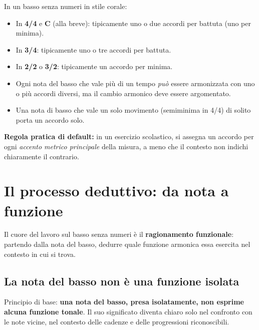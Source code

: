 \begin{regola}
	\label{reg:ritmo_armonico_battuta}
	In un basso senza numeri in stile corale:
	\begin{itemize}
		\item In \textbf{4/4} e \textbf{C} (alla breve): tipicamente uno o due accordi per battuta (uno per minima).
		\item In \textbf{3/4}: tipicamente uno o tre accordi per battuta.
		\item In \textbf{2/2} o \textbf{3/2}: tipicamente un accordo per minima.
		\item Ogni nota del basso che vale più di un tempo \textit{può} essere armonizzata con uno o più accordi diversi, ma il cambio armonico deve essere argomentato.
		\item Una nota di basso che vale un solo movimento (semiminima in 4/4) di solito porta un accordo solo.
	\end{itemize}
	\textbf{Regola pratica di default:} in un esercizio scolastico, si assegna un accordo per ogni \textit{accento metrico principale} della misura, a meno che il contesto non indichi chiaramente il contrario.
\end{regola}

\section{Il processo deduttivo: da nota a funzione}
\label{sec:processo_deduttivo}

Il cuore del lavoro sul basso senza numeri è il \textbf{ragionamento funzionale}: partendo dalla nota del basso, dedurre quale funzione armonica essa esercita nel contesto in cui si trova.

\subsection{La nota del basso non è una funzione isolata}

Principio di base: \textbf{una nota del basso, presa isolatamente, non esprime alcuna funzione tonale}. Il suo significato diventa chiaro solo nel confronto con le note vicine, nel contesto delle cadenze e delle progressioni riconoscibili.

